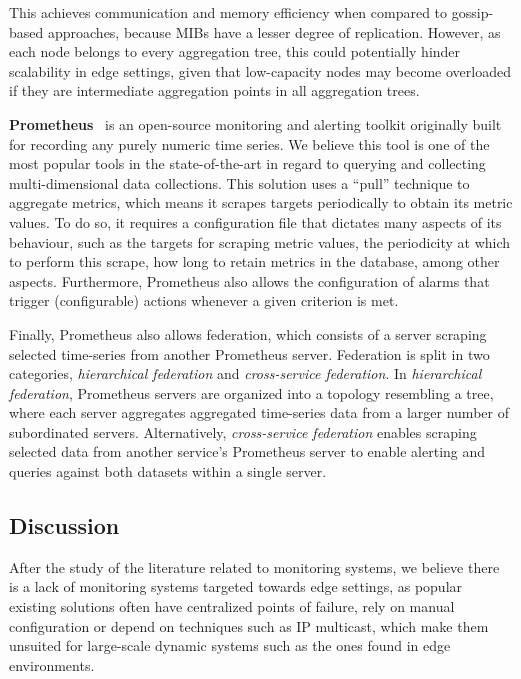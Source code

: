This achieves communication and memory efficiency when compared to gossip-based approaches, because MIBs have a lesser degree of replication. However, as each node belongs to every aggregation tree, this could potentially hinder scalability in edge settings, given that low-capacity nodes may become overloaded if they are intermediate aggregation points in all aggregation trees. 

\textbf{Prometheus}~\cite{prometheus} is an open-source monitoring and alerting toolkit originally built for recording any purely numeric time series. We believe this tool is one of the most popular tools in the state-of-the-art in regard to querying and collecting multi-dimensional data collections. This solution uses a ``pull'' technique to aggregate metrics, which means it scrapes targets periodically to obtain its metric values. To do so, it requires a configuration file that dictates many aspects of its behaviour, such as the targets for scraping metric values, the periodicity at which to perform this scrape, how long to retain metrics in the database, among other aspects. Furthermore, Prometheus also allows the configuration of alarms that trigger (configurable) actions whenever a given criterion is met. 

Finally, Prometheus also allows federation, which consists of a server scraping selected time-series from another Prometheus server. Federation is split in two categories, \textit{hierarchical federation} and \textit{cross-service federation}. In \textit{hierarchical federation}, Prometheus servers are organized into a topology resembling a tree, where each server aggregates aggregated time-series data from a larger number of subordinated servers. Alternatively,  \textit{cross-service federation} enables scraping selected data from another service's Prometheus server to enable alerting and queries against both datasets within a single server. 

\subsection{Discussion}

After the study of the literature related to monitoring systems, we believe there is a lack of monitoring systems targeted towards edge settings, as popular existing solutions often have centralized points of failure, rely on manual configuration or depend on techniques such as IP multicast, which make them unsuited for large-scale dynamic systems such as the ones found in edge environments.

